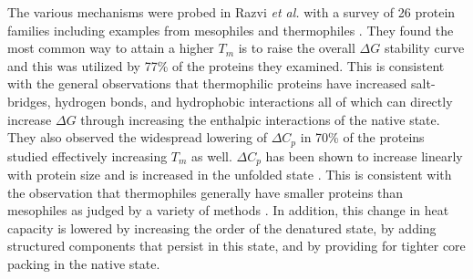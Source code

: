 The various mechanisms were probed in Razvi \emph{et al.} with a survey of 26
protein families including examples from mesophiles and thermophiles
\cite{razvi2006lst}.  They found the most common way to attain a higher ${T
}_{m }$ is to raise the overall $\Delta G$ stability curve and this was
utilized by 77\% of the proteins they examined.  This is consistent with the
general observations that thermophilic proteins have increased salt-bridges,
hydrogen bonds, and hydrophobic interactions all of which can directly increase
$\Delta G$ through increasing the enthalpic interactions of the native state.
They also observed the widespread lowering of $\Delta  {C }_{p }$ in 70\% of
the proteins studied effectively increasing ${T }_{m }$ as well.  $\Delta {C
}_{p }$ has been shown to increase linearly with protein size and is increased
in the unfolded state \cite{myers1995dmv}. This is consistent with the
observation that thermophiles generally have smaller proteins than mesophiles
as judged by a variety of methods \cite{chakravarty2002efr}.  In addition, this
change in heat capacity is lowered by increasing the order of the denatured
state, by adding structured components that persist in this state, and by
providing for tighter core packing in the native state.



